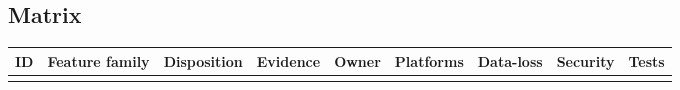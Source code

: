 \documentclass[
  letterpaper,
]{article}
\newcounter{none} %
\begin{document}
\begin{landscape}

\subsection{Matrix}\label{matrix}

{\def\LTcaptype{none} %
\begin{longtable}[]{@{}
  >{\raggedright\arraybackslash}p{}
  >{\raggedright\arraybackslash}p{}
  >{\raggedright\arraybackslash}p{}
  >{\raggedright\arraybackslash}p{}
  >{\raggedright\arraybackslash}p{}
  >{\raggedright\arraybackslash}p{}
  >{\raggedright\arraybackslash}p{}
  >{\raggedright\arraybackslash}p{}
  >{\raggedright\arraybackslash}p{}@{}}
\toprule\noalign{}
\begin{minipage}[b]{\linewidth}\raggedright
ID
\end{minipage} & \begin{minipage}[b]{\linewidth}\raggedright
Feature family
\end{minipage} & \begin{minipage}[b]{\linewidth}\raggedright
Disposition
\end{minipage} & \begin{minipage}[b]{\linewidth}\raggedright
Evidence
\end{minipage} & \begin{minipage}[b]{\linewidth}\raggedright
Owner
\end{minipage} & \begin{minipage}[b]{\linewidth}\raggedright
Platforms
\end{minipage} & \begin{minipage}[b]{\linewidth}\raggedright
Data-loss
\end{minipage} & \begin{minipage}[b]{\linewidth}\raggedright
Security
\end{minipage} & \begin{minipage}[b]{\linewidth}\raggedright
Tests
\end{minipage} \\
\midrule\noalign{}
\endhead
\bottomrule\noalign{}

\end{longtable}}
\end{landscape}
\end{document}
